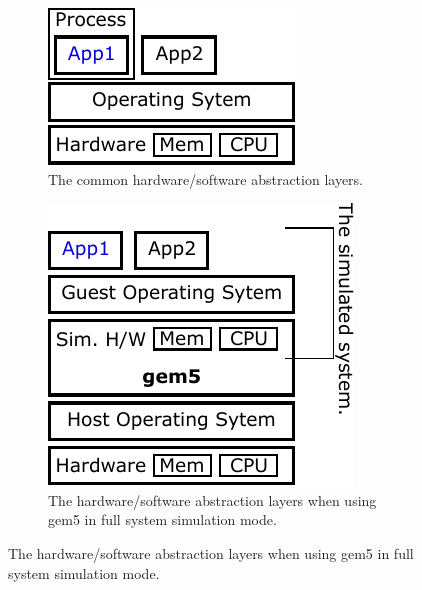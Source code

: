 \begin{figure}
  \begin{subfigure}{0.28\linewidth}
    \centering
    \includegraphics[width=\linewidth]{fig/gem5-fs-normal}
    \caption{The common hardware/software abstraction layers.}
    \label{fig:gem5-fs-normal}
  \end{subfigure}
  \hfill
  \begin{subfigure}{0.28\linewidth}
    \centering
    \includegraphics[width=\linewidth]{fig/gem5-fs-fs}
    \caption{The hardware/software abstraction layers when using gem5 in full system simulation mode.}
    \label{fig:gem5-fs-fs}
  \end{subfigure}

\end{figure}
